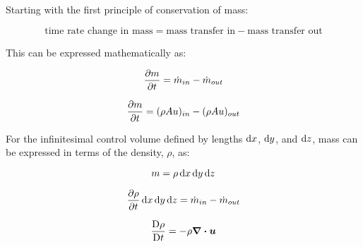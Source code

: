 \documentclass[11pt, oneside]{article}   	%
\newcommand{\vect}[1]{\boldsymbol{#1}} %
\begin{document}
Starting with the first principle of conservation of mass:

\begin{equation}
\text{time rate change in mass} = \text{mass transfer in} - \text{mass transfer out}
\end{equation}

\noindent 
This can be expressed mathematically as:

\begin{equation}
\pdv{m}{t} = \dot{m}_{in} - \dot{m}_{out}
\end{equation}

\begin{equation}
\pdv{m}{t} = (\rho A u)_{in} - (\rho A u)_{out}
\end{equation}

\noindent
For the infinitesimal control volume defined by lengths $\dif x$, $\dif y$, and $\dif z$, mass can be expressed in terms of the density, $\rho$, as:

\begin{equation}
m = \rho \dif x \dif y \dif z
\end{equation}

\begin{equation}
\pdv{\rho}{t} \dif x \dif y \dif z = \dot{m}_{in} - \dot{m}_{out}
\end{equation}

\begin{equation}
\frac{\Dif \rho}{\Dif t}   = - \rho \div \vect{u}
\end{equation}
\end{document}
